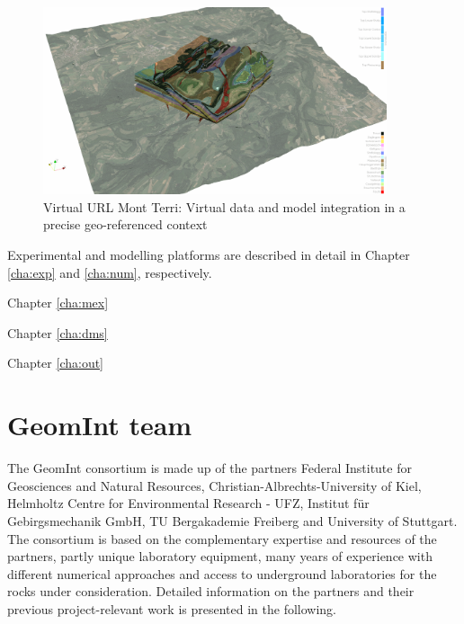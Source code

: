 \begin{figure}[ht!]
\centering
\includegraphics[width=0.9\textwidth]{figures/mt-surface+move.png}
\caption{Virtual URL Mont Terri: Virtual data and model integration in a precise geo-referenced context}
\label{fig:vr-url}
\end{figure}

Experimental and modelling platforms are described in detail in Chapter \ref{cha:exp} and \ref{cha:num}, respectively.

\begin{list}{-}{\leftmargin=1em \itemindent=0em \itemsep=0em}
\item Chapter \ref{cha:mex}
\item Chapter \ref{cha:dms}
\item Chapter \ref{cha:out}
\end{list}

\clearpage
\section{GeomInt team}
\label{sec:team}

The GeomInt consortium is made up of the partners Federal Institute for Geosciences and Natural Resources, Christian-Albrechts-University of Kiel, Helmholtz Centre for Environmental Research - UFZ, Institut f\"ur Gebirgs\-mechanik GmbH, TU Bergakademie Freiberg and University of Stuttgart. The consortium is based on the complementary expertise and resources of the partners, partly unique laboratory equipment, many years of experience with different numerical approaches and access to underground laboratories for the rocks under consideration. Detailed information on the partners and their previous project-relevant work is presented in the following.

